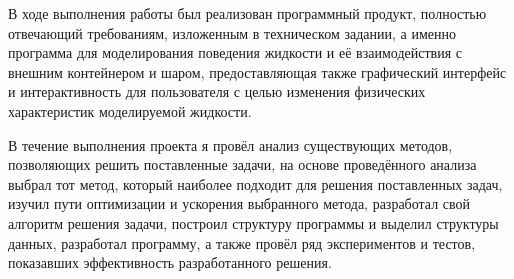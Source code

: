 \Conclusion

В ходе выполнения работы был реализован программный продукт, полностью отвечающий требованиям, изложенным в техническом задании, а именно программа для моделирования поведения жидкости и её взаимодействия с внешним контейнером и шаром, предоставляющая также графический интерфейс и интерактивность для пользователя с целью изменения физических характеристик моделируемой жидкости.

В течение выполнения проекта я провёл анализ существующих методов, позволяющих решить поставленные задачи, на основе проведённого анализа выбрал тот метод, который наиболее подходит для решения поставленных задач, изучил пути оптимизации и ускорения выбранного метода, разработал свой алгоритм решения задачи, построил структуру программы и выделил структуры данных, разработал программу, а также провёл ряд экспериментов и тестов, показавших эффективность разработанного решения.
